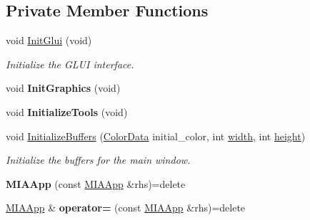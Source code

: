 \subsection*{Private Member Functions}
\begin{DoxyCompactItemize}
\item 
void \hyperlink{classimage__tools_1_1MIAApp_a73dda8b4bfb9f31c8a267774dfecdeaa}{Init\+Glui} (void)\hypertarget{classimage__tools_1_1MIAApp_a73dda8b4bfb9f31c8a267774dfecdeaa}{}\label{classimage__tools_1_1MIAApp_a73dda8b4bfb9f31c8a267774dfecdeaa}

\begin{DoxyCompactList}\small\item\em Initialize the G\+L\+UI interface. \end{DoxyCompactList}\item 
void {\bfseries Init\+Graphics} (void)\hypertarget{classimage__tools_1_1MIAApp_a3d0f36c690bcd1f3eb85c2f92da6a5b3}{}\label{classimage__tools_1_1MIAApp_a3d0f36c690bcd1f3eb85c2f92da6a5b3}

\item 
void {\bfseries Initialize\+Tools} (void)\hypertarget{classimage__tools_1_1MIAApp_a768738c46649d07ea6cb6b5ef728e731}{}\label{classimage__tools_1_1MIAApp_a768738c46649d07ea6cb6b5ef728e731}

\item 
void \hyperlink{classimage__tools_1_1MIAApp_a712453910e5325d90d7d0835ac00d059}{Initialize\+Buffers} (\hyperlink{classimage__tools_1_1ColorData}{Color\+Data} initial\+\_\+color, int \hyperlink{classimage__tools_1_1BaseGfxApp_a2fe403c5392f624477c2ce4429f1a7b5}{width}, int \hyperlink{classimage__tools_1_1BaseGfxApp_aa961e13a7a8e6062204223cc33ac7503}{height})\hypertarget{classimage__tools_1_1MIAApp_a712453910e5325d90d7d0835ac00d059}{}\label{classimage__tools_1_1MIAApp_a712453910e5325d90d7d0835ac00d059}

\begin{DoxyCompactList}\small\item\em Initialize the buffers for the main window. \end{DoxyCompactList}\item 
{\bfseries M\+I\+A\+App} (const \hyperlink{classimage__tools_1_1MIAApp}{M\+I\+A\+App} \&rhs)=delete\hypertarget{classimage__tools_1_1MIAApp_a5ae3748b77cc55a1100083b02b088927}{}\label{classimage__tools_1_1MIAApp_a5ae3748b77cc55a1100083b02b088927}

\item 
\hyperlink{classimage__tools_1_1MIAApp}{M\+I\+A\+App} \& {\bfseries operator=} (const \hyperlink{classimage__tools_1_1MIAApp}{M\+I\+A\+App} \&rhs)=delete\hypertarget{classimage__tools_1_1MIAApp_a067b980221f818a3a42d11f516d666f0}{}\label{classimage__tools_1_1MIAApp_a067b980221f818a3a42d11f516d666f0}

\end{DoxyCompactItemize}
